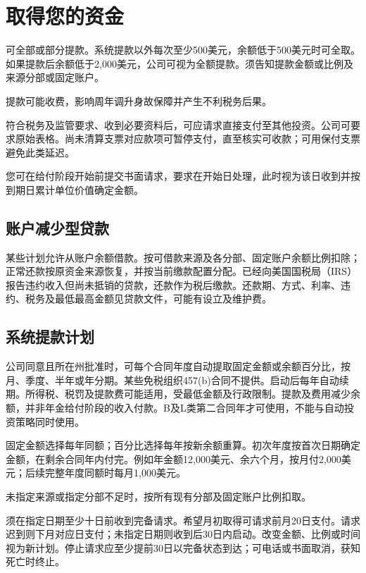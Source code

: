 \documentclass[UTF8,fontset=none,11pt,a4paper]{ctexart}
\begin{document}
\section*{取得您的资金}
可全部或部分提款。系统提款以外每次至少500美元，余额低于500美元时可全取。如果提款后余额低于2,000美元，公司可视为全额提款。须告知提款金额或比例及来源分部或\allowbreak\mbox{固定账户。}


提款可能收费，影响周年调升身故保障并产生不利\allowbreak\mbox{税务后果。}


符合税务及监管要求、收到必要资料后，可应请求直接支付至其他投资。公司可要求原始表格。尚未清算支票对应款项可暂停支付，直至核实可收款；可用保付支票避免\allowbreak\mbox{此类延迟。}


您可在给付阶段开始前提交书面请求，要求在开始日处理，此时视为该日收到并按到期日累计单位价值\allowbreak\mbox{确定金额。}


\subsection*{账户减少型贷款}
某些计划允许从账户余额借款。按可借款来源及各分部、固定账户余额比例扣除；正常还款按原资金来源恢复，并按当前缴款配置分配。已经向美国国税局（IRS）报告违约收入但尚未抵销的贷款，还款作为税后缴款。还款期、方式、利率、违约、税务及最低最高金额见贷款文件，可能有设立及\allowbreak\mbox{维护费。}


\subsection*{系统提款计划}
公司同意且所在州批准时，可每个合同年度自动提取固定金额或余额百分比，按月、季度、半年或年分期。某些免税组织457(b)合同不提供。启动后每年自动续期。所得税、税罚及提款费可能适用，受最低金额及行政限制。提款及费用减少余额，并非年金给付阶段的收入付款。B及L类第二合同年才可使用，不能与自动投资策略\allowbreak\mbox{同时使用。}


固定金额选择每年同额；百分比选择每年按新余额重算。初次年度按首次日期确定金额，在剩余合同年内付完。例如年金额12,000美元、余六个月，按月付2,000美元；后续完整年度同额时每月1,000美元。


未指定来源或指定分部不足时，按所有现有分部及固定账户\allowbreak\mbox{比例扣取。}


须在指定日期至少十日前收到完备请求。希望月初取得可请求前月20日支付。请求迟到则下月对应日支付；未指定日期则收到后30日内启动。改变金额、比例或时间视为新计划。停止请求应至少提前30日以完备状态到达；可电话或书面取消，获知死\allowbreak\mbox{亡时终止。}
\end{document}
